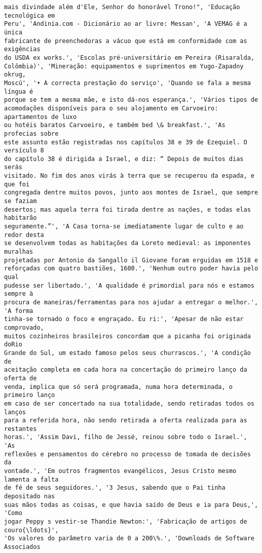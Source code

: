 \documentclass[10pt]{article}
\begin{document}
\begin{Verbatim}[commandchars=\\\{\}]
mais divindade além d'Ele, Senhor do honorável Trono!", 'Educação tecnológica em
Peru', 'Andinia.com - Dicionário ao ar livre: Messan', 'A VEMAG é a única
fabricante de preenchedoras a vácuo que está em conformidade com as exigências
do USDA ex works.', 'Escolas pré-universitário em Pereira (Risaralda,
Colômbia)', 'Mineração: equipamentos e suprimentos em Yugo-Zapadny okrug,
Moscú', '• A correcta prestação do serviço', 'Quando se fala a mesma língua é
porque se tem a mesma mãe, e isto dá-nos esperança.', 'Vários tipos de
acomodações disponíveis para o seu alojamento em Carvoeiro: apartamentos de luxo
ou hotéis baratos Carvoeiro, e também bed \& breakfast.', 'As profecias sobre
este assunto estão registradas nos capítulos 38 e 39 de Ezequiel. O versículo 8
do capítulo 38 é dirigida a Israel, e diz: “ Depois de muitos dias serás
visitado. No fim dos anos virás à terra que se recuperou da espada, e que foi
congregada dentre muitos povos, junto aos montes de Israel, que sempre se faziam
desertos; mas aquela terra foi tirada dentre as nações, e todas elas habitarão
seguramente.”', 'A Casa torna-se imediatamente lugar de culto e ao redor desta
se desenvolvem todas as habitações da Loreto medieval: as imponentes muralhas
projetadas por Antonio da Sangallo il Giovane foram erguidas em 1518 e
reforçadas com quatro bastiões, 1600.', 'Nenhum outro poder havia pelo qual
pudesse ser libertado.', 'A qualidade é primordial para nós e estamos sempre à
procura de maneiras/ferramentas para nos ajudar a entregar o melhor.', 'A forma
tinha-se tornado o foco e engraçado. Eu ri:', 'Apesar de não estar comprovado,
muitos cozinheiros brasileiros concordam que a picanha foi originada doRio
Grande do Sul, um estado famoso pelos seus churrascos.', 'A condição de
aceitação completa em cada hora na concertação do primeiro lanço da oferta de
venda, implica que só será programada, numa hora determinada, o primeiro lanço
em caso de ser concertado na sua totalidade, sendo retiradas todos os lanços
para a referida hora, não sendo retirada a oferta realizada para as restantes
horas.', 'Assim Davi, filho de Jessé, reinou sobre todo o Israel.', 'As
reflexões e pensamentos do cérebro no processo de tomada de decisões da
vontade.', 'Em outros fragmentos evangélicos, Jesus Cristo mesmo lamenta a falta
de fé de seus seguidores.', '3 Jesus, sabendo que o Pai tinha depositado nas
suas mãos todas as coisas, e que havia saído de Deus e ia para Deus,', 'Como
jogar Peppy s vestir-se Thandie Newton:', 'Fabricação de artigos de couro{\ldots}',
'Os valores do parâmetro varia de 0 a 200\%.', 'Downloads de Software Associados

\end{Verbatim}
\end{document}
